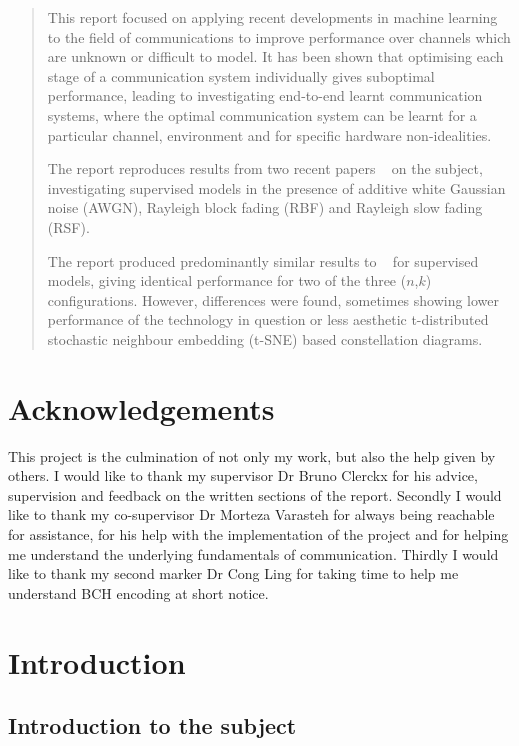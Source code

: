 \documentclass[12pt,onecolumn,letterpaper]{article}
\begin{document}
\begin{abstract}   
   This report focused on applying recent developments in machine learning to the field of communications to improve performance over channels which are unknown or difficult to model. It has been shown that optimising each stage of a communication system individually gives suboptimal performance, leading to investigating end-to-end learnt communication systems, where the optimal communication system can be learnt for a particular channel, environment and for specific hardware non-idealities.
   
   The report reproduces results from two recent papers ~\cite{oShea,Aoudia} on the subject, investigating supervised models in the presence of additive white Gaussian noise (AWGN), Rayleigh block fading (RBF) and Rayleigh slow fading (RSF). 
   
   The report produced predominantly similar results to ~\cite{oShea} for supervised models, giving identical performance for two of the three ($n$,$k$) configurations. However, differences were found, sometimes showing lower performance of the technology in question or less aesthetic t-distributed stochastic neighbour embedding (t-SNE) based constellation diagrams.
\end{abstract}
\pagebreak

\section*{Acknowledgements}
This project is the culmination of not only my work, but also the help given by others. I would like to thank my supervisor Dr Bruno Clerckx for his advice, supervision and feedback on the written sections of the report. Secondly I would like to thank 
my co-supervisor Dr Morteza Varasteh for always being reachable for assistance, for his help with the implementation of the project and for helping me understand the underlying fundamentals of communication. Thirdly I would like to thank my second marker Dr Cong Ling for taking time to help me understand BCH encoding at short notice.
\pagebreak

\tableofcontents
\pagebreak

\FloatBarrier
\section{Introduction}

\subsection{Introduction to the subject}
\end{document}
